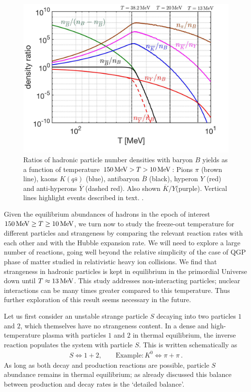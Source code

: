 \begin{figure} 
\centerline{
\includegraphics[width=0.9\linewidth]{./plots/Meson_Baryon_density_ratio_C.jpg}}
\caption{Ratios of hadronic particle number densities with baryon $B$ yields as a function of temperature $150\text{\,MeV}> T>10\text{\,MeV}$: Pions $\pi$ (brown line), kaons $K( q\bar s)$ (blue), antibaryon $\overline B$ (black), hyperon $Y$ (red) and anti-hyperons $\overline Y$ (dashed red). Also shown $\overline K/Y$(purple). Vertical lines highlight events described in text.  
. }
\label{EquilibPartRatiosFig} 
\end{figure}

Given the equilibrium abundances of hadrons in the epoch of interest $150\text{\,MeV}\ge T\ge 10\text{\,MeV}$, we turn now to study the freeze-out temperature for different particles and strangeness by comparing the relevant reaction rates with each other and with the Hubble expansion rate. We will need to explore a large number of reactions, going well beyond the relative simplicity of the case of QGP phase of matter studied in relativistic heavy ion collisions. We find that strangeness in hadronic particles is kept in equilibrium in the primordial Universe down until $T\approx 13\text{\,MeV}$. This study addresses non-interacting particles; nuclear interactions can be many times greater compared to this temperature. Thus further exploration of this result seems necessary in the future.

Let us first consider an unstable strange particle $S$ decaying into two particles $1$ and $2$, which themselves have no strangeness content. In a dense and high-temperature plasma with particles $1$ and $2$ in thermal equilibrium, the inverse reaction populates the system with particle $S$. This is written schematically as
\begin{align}
 S\Longleftrightarrow1+2,\qquad \mathrm{Example}: K^0\Longleftrightarrow\pi+\pi\,.
\end{align}
As long as both decay and production reactions are possible, particle $S$ abundance remains in thermal equilibrium; as already discussed this balance between production and decay rates is the `detailed balance'.

